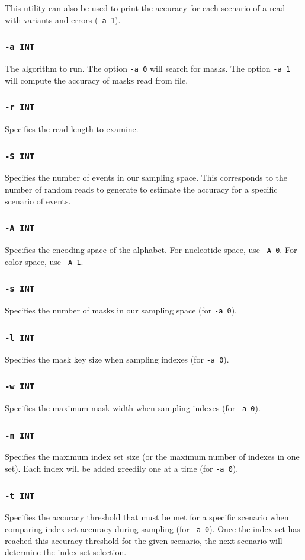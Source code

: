 \documentclass[a4paper,12pt]{book}
\newcommand{\TT}[1]{{\tt #1}} %
\begin{document}
This utility can also be used to print the accuracy for each scenario of a read with variants and errors (\TT{-a 1}). 

\subsubsection{\TT{-a INT}}
The algorithm to run.
The option \TT{-a 0} will search for masks.
The option \TT{-a 1} will compute the accuracy of masks read from file.
\subsubsection{\TT{-r INT}}
Specifies the read length to examine.
\subsubsection{\TT{-S INT}}
Specifies the number of events in our sampling space.
This corresponds to the number of random reads to generate to estimate the accuracy for a specific scenario of events.
\subsubsection{\TT{-A INT}}
Specifies the encoding space of the alphabet.
For nucleotide space, use \TT{-A 0}.
For color space, use \TT{-A 1}.
\subsubsection{\TT{-s INT}}
Specifies the number of masks in our sampling space (for \TT{-a 0}).
\subsubsection{\TT{-l INT}}
Specifies the mask key size when sampling indexes (for \TT{-a 0}).
\subsubsection{\TT{-w INT}}
Specifies the maximum mask width when sampling indexes (for \TT{-a 0}).
\subsubsection{\TT{-n INT}}
Specifies the maximum index set size (or the maximum number of indexes in one set).
Each index will be added greedily one at a time (for \TT{-a 0}).
\subsubsection{\TT{-t INT}}
Specifies the accuracy threshold that must be met for a specific scenario when comparing index set accuracy during sampling (for \TT{-a 0}).
Once the index set has reached this accuracy threshold for the given scenario, the next scenario will determine the index set selection.
\end{document}
